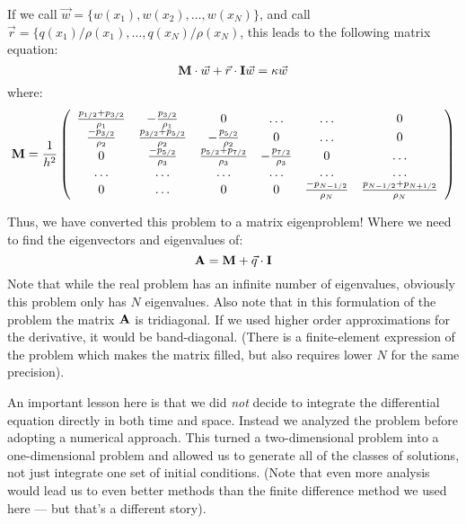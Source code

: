 If we call $\vec{w} = \{w(x_1), w(x_2), \ldots, w(x_N)\}$, and call
$\vec{r} = \{q(x_1)/\rho(x_1), \ldots, q(x_N)/\rho(x_N)$,
this leads to the following matrix equation:
\begin{equation}
{\bf M}\cdot \vec{w} + \vec{r}\cdot{\ensuremath{{\bf I}}}\vec{w} = \kappa \vec{w}
\end{equation}
where:
\begin{equation}
  {\bf M} = \frac{1}{h^2} \left(\begin{array}{cccccc}
    \frac{p_{1/2} + p_{3/2}}{\rho_1} & - \frac{p_{3/2}}{\rho_1} & 0 & \ldots & \ldots & 0 \cr
    \frac{- p_{3/2}}{\rho_2} & \frac{p_{3/2} + p_{5/2}}{\rho_2} & -\frac{p_{5/2}}{\rho_2} & 0 & \ldots & 0 \cr
    0 & \frac{- p_{5/2}}{\rho_3} & \frac{p_{5/2} + p_{7/2}}{\rho_3} & -\frac{p_{7/2}}{\rho_3} & 0 & \ldots \cr
    \ldots & \ldots & \ldots & \ldots & \ldots & \ldots \cr
    0 & \ldots & 0 & 0 & \frac{- p_{N-1/2}}{\rho_N}  & \frac{p_{N-1/2} + p_{N+1/2} }{\rho_N}
\end{array}\right)
\end{equation}

Thus, we have converted this problem to a matrix eigenproblem!  Where
we need to find the eigenvectors and eigenvalues of:
\begin{equation}
{\bf A} = {\bf M} + \vec{q}\cdot{\bf I}
\end{equation}
Note that while the real problem has an infinite number of
eigenvalues, obviously this problem only has $N$ eigenvalues. Also
note that in this formulation of the problem the   matrix ${\bf A}$ is
tridiagonal. If we used higher order approximations for the
derivative, it would be band-diagonal. (There is a finite-element
expression of the problem which makes the matrix filled, but also
requires lower $N$ for the same precision).

An important lesson here is that we did {\it not} decide to integrate
the differential equation directly in both time and space. Instead we
analyzed the problem before adopting a numerical approach. This turned
a two-dimensional problem into a one-dimensional problem and allowed
us to generate all of the classes of solutions, not just integrate
one set of initial conditions. (Note that even more analysis would
lead us to even better methods than the finite difference method we
used here --- but that's a different story).

